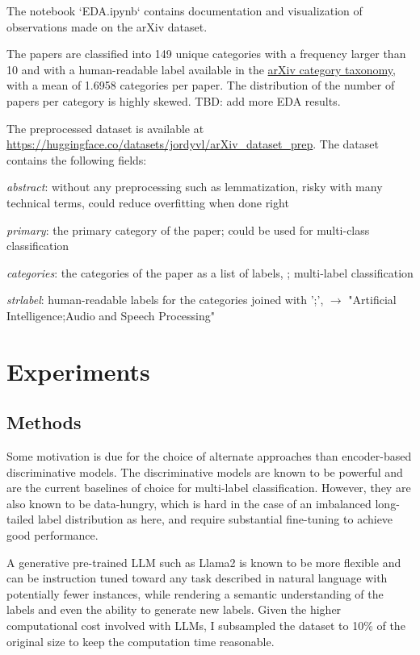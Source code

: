 \documentclass[11pt,letterpaper]{article}
\begin{document}
The notebook `EDA.ipynb` contains documentation and visualization of observations made on the arXiv dataset.

The papers are classified into 149 unique categories with a frequency larger than 10 and with a human-readable label available in the \href{https://arxiv.org/category_taxonomy}{arXiv category taxonomy}, with a mean of 1.6958 categories per paper. The distribution of the number of papers per category is highly skewed. TBD: add more EDA results.

The preprocessed dataset is available at \url{https://huggingface.co/datasets/jordyvl/arXiv_dataset_prep}. The dataset contains the following fields:
\begin{simplist}
  \item \textit{abstract}: without any preprocessing such as lemmatization, risky with many technical terms, could reduce overfitting when done right
  \item \textit{primary}: the primary category of the paper; could be used for multi-class classification
  \item \textit{categories}: the categories of the paper as a list of labels, \eg [cs.AI, eess.AS]; multi-label classification
  \item \textit{strlabel}: human-readable labels for the categories joined with ';', \eg [cs.AI, eess.AS]  $\to$ "Artificial Intelligence;Audio and Speech Processing"
\end{simplist}


\section{Experiments}

\subsection{Methods}

Some motivation is due for the choice of alternate approaches than encoder-based discriminative models. The discriminative models are known to be powerful and are the current baselines of choice for multi-label classification. However, they are also known to be data-hungry, which is hard in the case of an imbalanced long-tailed label distribution as here, and require substantial fine-tuning to achieve good performance.

A generative pre-trained LLM such as Llama2 \cite{touvron2023llama} is known to be more flexible and can be instruction tuned toward any task described in natural language with potentially fewer instances,
while rendering a semantic understanding of the labels and even the ability to generate new labels. Given the higher computational cost involved with LLMs, I subsampled the dataset to 10\% of the original size to keep the computation time reasonable.
\end{document}
